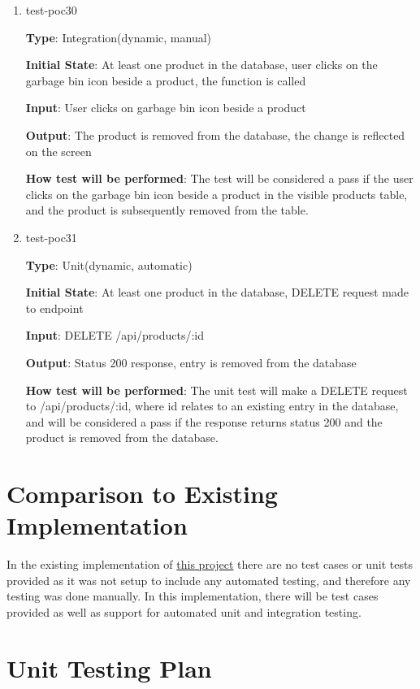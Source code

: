 \documentclass[12pt, titlepage]{article}
\begin{document}
\begin{enumerate}
\item{test-poc30\\}

\textbf{Type}: Integration(dynamic, manual)

\textbf{Initial State}: At least one product in the database, user clicks on the garbage bin icon beside a product, the function is called

\textbf{Input}: User clicks on garbage bin icon beside a product

\textbf{Output}: The product is removed from the database, the change is reflected on the screen

\textbf{How test will be performed}: The test will be considered a pass if the user clicks on the garbage bin icon beside a product in the visible products table, and the product is subsequently removed from the table.

\item{test-poc31\\}

\textbf{Type}: Unit(dynamic, automatic)

\textbf{Initial State}: At least one product in the database, DELETE request made to endpoint

\textbf{Input}: DELETE /api/products/:id

\textbf{Output}: Status 200 response, entry is removed from the database

\textbf{How test will be performed}: The unit test will make a DELETE request to /api/products/:id, where id relates to an existing entry in the database, and will be considered a pass if the response returns status 200 and the product is removed from the database.
\end{enumerate}


\section{Comparison to Existing Implementation}
\label{sec:exist}
In the existing implementation of \href{https://github.com/siamon123/warehouse-inventory-system}{this project} there are no test cases or unit tests provided as it was not setup to include any automated testing, and therefore any testing was done manually. In this implementation, there will be test cases provided as well as support for automated unit and integration testing.


\section{Unit Testing Plan}
\label{sec:unit}
\end{document}

